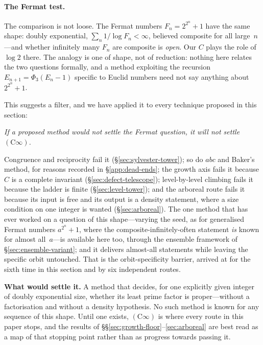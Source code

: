 \paragraph{The Fermat test.}
The comparison is not loose.  The Fermat numbers $F_n = 2^{2^n}+1$ have the
same shape: doubly exponential, $\sum_n 1/\log F_n < \infty$, believed
composite for all large~$n$---and whether infinitely many $F_n$ are
composite is \emph{open}.  Our $C$ plays the role of $\log 2$ there.
The analogy is one of shape, not of reduction: nothing here relates the
two questions formally, and a method exploiting the recursion
$E_{n+1} = \Phi_3(E_n - 1)$ specific to Euclid numbers need not say
anything about $2^{2^n}+1$.

This suggests a filter, and we have applied it to every technique proposed
in this section:

\begin{center}
\emph{If a proposed method would not settle the Fermat question, it will
not settle $(\mathrm{C}\infty)$.}
\end{center}

\noindent
Congruence and reciprocity fail it (\S\ref{sec:sylvester-tower}); so do
$abc$ and Baker's method, for reasons recorded in
\S\ref{app:dead-ends}; the growth axis fails it because $C$ is a complete
invariant (\S\ref{sec:defect-telescope}); level-by-level climbing fails it
because the ladder is finite (\S\ref{sec:level-tower}); and the arboreal
route fails it because its input is free and its output is a density
statement, where a size condition on one integer is wanted
(\S\ref{sec:arboreal}).  The one method that has ever worked on a question
of this shape---varying the seed, as for generalised Fermat numbers
$a^{2^n}+1$, where the composite-infinitely-often statement \emph{is} known
for almost all~$a$---is available here too, through the ensemble framework
of \S\ref{sec:ensemble-variant}; and it delivers almost-all statements
while leaving the specific orbit untouched.  That is the orbit-specificity
barrier, arrived at for the sixth time in this section and by six
independent routes.

\begin{frontierbox}
\textbf{What would settle it.}
A method that decides, for one explicitly given integer of doubly
exponential size, whether its least prime factor is proper---without a
factorisation and without a density hypothesis.  No such method is known
for any sequence of this shape.  Until one exists, $(\mathrm{C}\infty)$ is
where every route in this paper stops, and the results of
\S\S\ref{sec:growth-floor}--\ref{sec:arboreal} are best read as a map of
that stopping point rather than as progress towards passing it.
\end{frontierbox}
